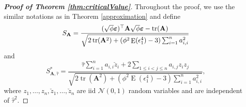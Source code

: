 \documentclass[11pt]{article}
\DeclareMathOperator{\mytr}{tr}
\DeclareMathOperator{\myE}{E}
\newcommand{\BA}{\mathbf{A}}    \newcommand{\BB}{\mathbf{B}}    \newcommand{\BC}{\mathbf{C}}    \newcommand{\BD}{\mathbf{D}}    \newcommand{\BE}{\mathbf{E}}    \newcommand{\BF}{\mathbf{F}}    \newcommand{\BG}{\mathbf{G}}    \newcommand{\BH}{\mathbf{H}}    \newcommand{\BI}{\mathbf{I}}    \newcommand{\BJ}{\mathbf{J}}    \newcommand{\BK}{\mathbf{K}}    \newcommand{\BL}{\mathbf{L}}
\theoremstyle{plain}
\theoremstyle{definition}
\theoremstyle{remark}
\begin{document}
\begin{appendices}
\begin{proof}[\textbf{Proof of Theorem \ref{thm:criticalValue}}]
    Throughout the proof, we use the similar notations as in Theorem \ref{approximation} and define
    \begin{equation*}
        S_\BA=\frac{
            (\sqrt \phi \bepsilon)^\top \BA \sqrt \phi \bepsilon - \mytr (\BA)
        }{
            \sqrt{
    2 \mytr(\BA^2)
    +
    (\phi^2\myE (\epsilon_1^4)-3) \sum_{i=1}^n a_{i,i}^2
            }             
        }
    \end{equation*}
    and
    \begin{equation*}
        S_{\BA, \hat \tau}^* =
        \frac{
            \hat \tau \sum_{i=1}^n  a_{i,i}\check z_i
        +2\sum_{1\leq i <j \leq n} a_{i,j} z_i z_j
    }
    {
            \sqrt{
    2 \mytr(\BA^2)
    +
    (\phi^2\myE (\epsilon_1^4)-3) \sum_{i=1}^n a_{i,i}^2
            }             
        },
    \end{equation*}
    where $z_1,\ldots, z_n, \check z_1,\ldots, \check z_n$ are iid $\mathcal N(0,1)$ random variables and are independent of $\hat \tau^2$.



\end{proof}
\end{appendices}
\end{document}
